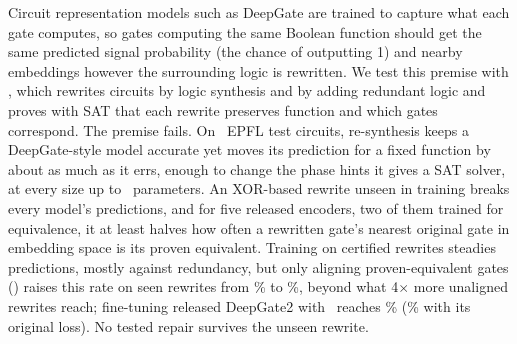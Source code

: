 Circuit representation models such as DeepGate are trained to capture what each gate computes, so gates computing the same
Boolean function should get the same predicted signal probability (the chance of outputting 1) and nearby embeddings however the
surrounding logic is rewritten. We test this premise with \audit, which rewrites circuits by logic synthesis and by
adding redundant logic and proves with SAT that each rewrite preserves function and which gates correspond. The
premise fails. On \NTestCones\ EPFL test circuits, re-synthesis keeps a DeepGate-style model accurate yet moves its
prediction for a fixed function by about as much as it errs, enough to change the phase hints it gives a SAT
solver, at every size up to \ScMaxParams\ parameters. An XOR-based rewrite unseen in training breaks every model's
predictions, and for five released encoders, two of them trained for equivalence, it at least halves
how often a rewritten gate's nearest original gate in embedding space is its proven equivalent. Training on
certified rewrites steadies predictions, mostly against redundancy, but only aligning proven-equivalent gates
(\ours) raises this rate on seen rewrites from \BaseTopRS\% to \OursTopRS\%, beyond what 4$\times$ more unaligned rewrites
reach; fine-tuning released DeepGate2 with \ours\ reaches \FtEqTopSeen\% (\FtCtrlTopSeen\% with its original loss).
No tested repair survives the unseen rewrite.
